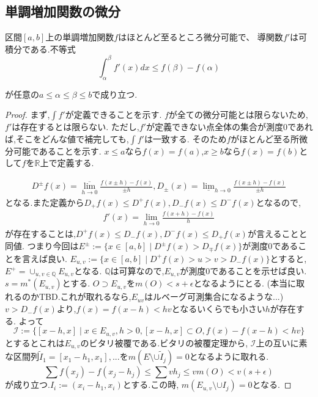 \subsection{単調増加関数の微分}

\begin{thm}
 区間$[a,b]$上の単調増加関数$f$はほとんど至るところ微分可能で、 導関数$f'$は可積分である.不等式
 \begin{equation*}
  \int_{\alpha}^{\beta} f'(x)dx \le f(\beta) - f(\alpha)
 \end{equation*}
\end{thm}
が任意の$a \le \alpha \le \beta \le b$で成り立つ.

\begin{proof}
まず,$\int f'$が定義できることを示す.
$f$が全ての微分可能とは限らないため,$f'$は存在するとは限らない.
ただし,$f'$が定義できない点全体の集合が測度0であれば,そこをどんな値で補完しても,$\int f'$は一致する.
そのため$f$がほとんど至る所微分可能であることを示す.
$x \le a$なら$f(x) = f(a)$,$x \ge b$なら$f(x) = f(b)$として$f$を$\mathbb{R}$上で定義する.

\begin{align*}
    D^{\pm}f(x) = \overline{\lim_{h \to 0}}\frac{f(x \pm h) - f(x)}{\pm h}, D_{\pm}(x) = \underline{\lim}_{h \to 0} \frac{f(x \pm h)  - f(x)}{\pm h}
\end{align*}
となる.また定義から$D_+f(x) \le D^+f(x), D_-f(x) \le D^-f(x)$となるので,
\begin{align*}
    f'(x) = \lim_{h \to 0}\frac{f(x+h) - f(x)}{h} 
\end{align*}
が存在することは,$D^+f(x) \le D_-f(x), D^-f(x) \le D_+f(x)$が言えることと同値.
つまり今回は$E^{\pm} := \{ x \in [a, b] \mid D^{\pm}f(x) > D_{\mp} f(x) \}$が測度0であることを言えば良い.
$E_{u,v} := \{x \in [a,b] \mid  D^+f(x) > u> v > D_-f(x)\}$とすると,
$E^+ = \cup_{u, v \in \mathbb{Q} }E_{u, v}$となる.
$\mathbb{Q}$は可算なので,$E_{u, v}$が測度0であることを示せば良い.
$s = m^*(E_{u, v})$とする.
$O \supset E_{u,v}$を$m(O) < s + \epsilon$となるようにとる.
(本当に取れるのかTBD.これが取れるなら,$E_{uv}$はルベーグ可測集合になるような...)
$v > D_-f(x)$より,$f(x) = f(x -h) < hv$となるいくらでも小さい$h$が存在する.
よって
\begin{equation*}
    \mathcal{I} := \{[x-h, x] \mid x \in E_{u,v} , h >0 , [x -h, x] \subset O, f(x) - f(x-h) < hv\}
\end{equation*}
とするとこれは$E_{u, v}$のビタリ被覆である.ビタリの被覆定理から,
$\mathcal{I}$上の互いに素な区間列$\tilde{I}_1 = [x_1-h_1, x_1], ...$を$m(E \setminus \cup \tilde{I}_j) = 0$となるように取れる.
\begin{equation*}
    \sum f(x_j) - f(x_j - h_j) \le \sum v h_j \le v m(O) < v(s + \epsilon)
\end{equation*}
が成り立つ.$I_i:= (x_i-h_1, x_i)$とする.この時, $m(E_{u,v} \setminus \cup I_j) = 0$となる.


\end{proof}
